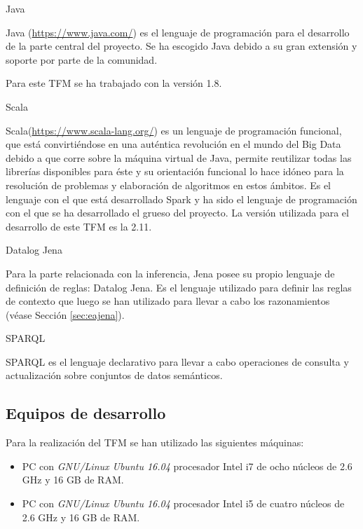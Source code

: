 \begin{definitionlist} 

\item[Java]

Java (\url{https://www.java.com/}) es el lenguaje de programación para el
desarrollo de la parte central del proyecto. Se ha escogido Java debido a su
gran extensión y soporte por parte de la comunidad. 

Para este \acs{TFM} se ha trabajado con la versión 1.8.

\item[Scala]

  Scala(\url{https://www.scala-lang.org/}) es un lenguaje de programación
  funcional, que está convirtiéndose en una auténtica revolución en el mundo del
  Big Data debido a que corre sobre la máquina virtual de Java, permite
  reutilizar todas las librerías disponibles para éste y su orientación
  funcional lo hace idóneo para la resolución de problemas y elaboración de
  algoritmos en estos ámbitos. Es el lenguaje con el
  que está desarrollado Spark y ha sido el lenguaje de programación con el que
  se ha desarrollado el grueso del proyecto. La versión utilizada para el desarrollo de este
  \acs{TFM} es la 2.11.


\item[Datalog Jena]

Para la parte relacionada con la inferencia, Jena posee su propio lenguaje de
definición de reglas: Datalog Jena. Es el lenguaje utilizado para definir las
reglas de contexto que luego se han utilizado para llevar a cabo los
razonamientos (véase Sección \ref{sec:eajena}). 



\item[\acs{SPARQL}]

\acs{SPARQL} es el lenguaje declarativo para llevar a cabo operaciones de
consulta y actualización sobre conjuntos de datos semánticos. 

\end{definitionlist}

\subsection{Equipos de desarrollo}

Para la realización del \acs{TFM} se han utilizado las siguientes máquinas: 

\begin{itemize}
\item PC con \textit{GNU/Linux Ubuntu 16.04} procesador Intel i7
  de ocho núcleos de 2.6 GHz y 16 GB de RAM.
\item PC con \textit{GNU/Linux Ubuntu 16.04} procesador Intel i5
  de cuatro núcleos de 2.6 GHz y 16 GB de RAM.   
\end{itemize}
